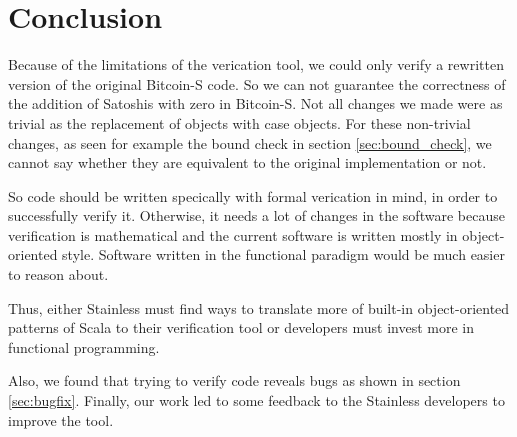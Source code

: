\chapter{Conclusion}
\label{chap:conclusion}

Because of the limitations of the verication tool, we could only verify a rewritten version of the original Bitcoin-S code.
So we can not guarantee the correctness of the addition of Satoshis with zero in Bitcoin-S.
Not all changes we made were as trivial as the replacement of objects with case objects.
For these non-trivial changes, as seen for example the bound check in section \ref{sec:bound_check}, we cannot say whether they are equivalent to the original implementation or not.

So code should be written specically with formal verication in mind, in order to successfully verify it.
Otherwise, it needs a lot of changes in the software because verification is mathematical and the current software is written mostly in object-oriented style.
Software written in the functional paradigm would be much easier to reason about.

Thus, either Stainless must find ways to translate more of built-in object-oriented patterns of Scala to their verification tool or developers must invest more in functional programming.

Also, we found that trying to verify code reveals bugs as shown in section \ref{sec:bugfix}. Finally, our work led to some feedback to the Stainless developers to improve the tool.
